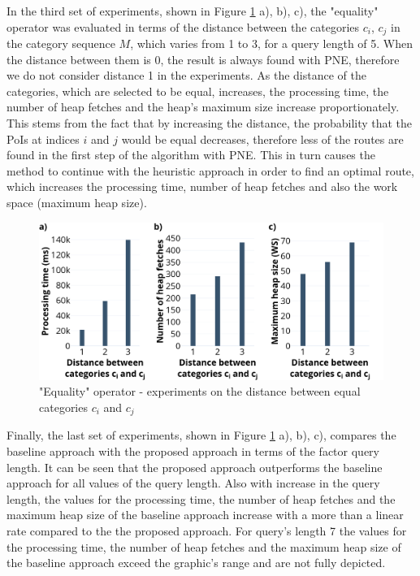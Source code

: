 In the third set of experiments, shown in Figure \ref{fig:eo_distance} a), b), c), the "equality" operator was evaluated in terms of the  distance between the categories $c_i$, $c_j$ in the category sequence $M$, which varies from 1 to 3, for a query length of 5. When the distance between them is 0, the result is always found with PNE, therefore we do not consider distance 1 in the experiments. 
As the distance of the categories, which are selected to be equal, increases, the processing time, the number of heap fetches and the heap's maximum size increase proportionately. This stems from the fact that by increasing the distance, the probability that the PoIs at indices $i$ and $j$ would be equal decreases, therefore less of the routes are found in the first step of the algorithm with PNE. This in turn causes the method to continue with the heuristic approach in order to find an optimal route, which increases the processing time, number of heap fetches and also the work space (maximum heap size).

\begin{figure}[h!]
	\includegraphics[scale=0.33]{images/eo_distance_30.png}
	\centering
	\caption{"Equality" operator - experiments on the distance between equal categories $c_i$ and $c_j$}
	\label{fig:eo_distance}
\end{figure}

Finally, the last set of experiments, shown in Figure \ref{fig:eo_distance} a), b), c), compares the baseline approach with the proposed approach in terms of the factor query length. It can be seen that the proposed approach outperforms the baseline approach for all values of the query length. Also with increase in the query length, the values for the processing time, the number of heap fetches and the maximum heap size of the baseline approach increase with a more than a linear rate compared to the the proposed approach. For query's length 7 the values for the processing time, the number of heap fetches and the maximum heap size of the baseline approach exceed the graphic's range and are not fully depicted.

